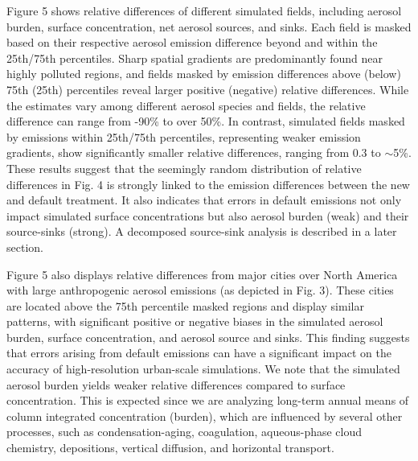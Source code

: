 Figure 5 shows relative differences of different simulated fields, including aerosol burden, surface concentration, net aerosol sources, and sinks. Each field is masked based on their respective aerosol emission difference beyond and within the 25th/75th percentiles. Sharp spatial gradients are predominantly found near highly polluted regions, and fields masked by emission differences above (below) 75th (25th) percentiles reveal larger positive (negative) relative differences. While the estimates vary among different aerosol species and fields, the relative difference can range from -90\% to over 50\%. In contrast, simulated fields masked by emissions within 25th/75th percentiles, representing weaker emission gradients, show significantly smaller relative differences, ranging from 0.3 to $\sim$5\%. These results suggest that the seemingly random distribution of relative differences in Fig. 4 is strongly linked to the emission differences between the new and default treatment. It also indicates that errors in default emissions not only impact simulated surface concentrations but also aerosol burden (weak) and their source-sinks (strong). A decomposed source-sink analysis is described in a later section.

Figure 5 also displays relative differences from major cities over North America with large anthropogenic aerosol emissions (as depicted in Fig. 3). These cities are located above the 75th percentile masked regions and display similar patterns, with significant positive or negative biases in the simulated aerosol burden, surface concentration, and aerosol source and sinks. This finding suggests that errors arising from default emissions can have a significant impact on the accuracy of high-resolution urban-scale simulations. We note that the simulated aerosol burden yields weaker relative differences compared to surface concentration. This is expected since we are analyzing long-term annual means of column integrated concentration (burden), which are influenced by several other processes, such as condensation-aging, coagulation, aqueous-phase cloud chemistry, depositions, vertical diffusion, and horizontal transport. 

